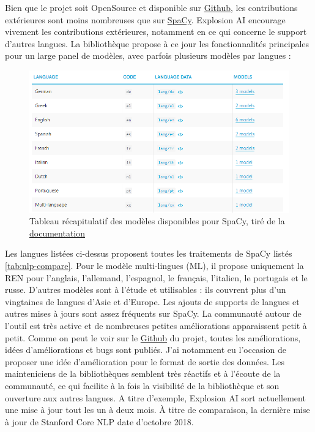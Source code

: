  Bien que le projet soit OpenSource et disponible sur \href{https://github.com/stanfordnlp/CoreNLP}{Github}, les contributions extérieures sont moins nombreuses que sur \href{https://github.com/explosion/spaCy}{SpaCy}. Explosion AI encourage vivement les contributions extérieures, notamment en ce qui concerne le support d'autres langues. La bibliothèque propose à ce jour les fonctionnalités principales pour un large panel de modèles, avec parfois plusieurs modèles par langues :
 \vspace{10pt}
\begin{figure}[H]
    \centering
    \includegraphics[scale=0.7]{images/spacy-lang.png}
    \caption{Tableau récapitulatif des modèles disponibles pour SpaCy, tiré de la \href{https://spacy.io/usage/models}{documentation}}
    \label{fig:spacy-lang}
\end{figure}
\vspace{10pt}

Les langues listées ci-dessus proposent toutes les traitements de SpaCy listés \autoref{tab:nlp-compare}. Pour le modèle multi-lingues (ML), il propose uniquement la REN pour l'anglais, l'allemand, l'espagnol, le français, l'italien, le portugais et le russe. D'autres modèles sont à l'étude et utilisables : ils couvrent plus d'un vingtaines de langues d'Asie et d'Europe. Les ajouts de supports de langues et autres mises à jours sont assez fréquents sur SpaCy. La communauté autour de l'outil est très active et de nombreuses petites améliorations apparaissent petit à petit. Comme on peut le voir sur le \href{https://github.com/explosion/spaCy}{Github} du projet, toutes les améliorations, idées d'améliorations et bugs sont publiés. J'ai notamment eu l'occasion de proposer une idée d'amélioration pour le format de sortie des données. Les mainteniciens de la bibliothèques semblent très réactifs et à l'écoute de la communauté, ce qui facilite à la fois la visibilité de la bibliothèque et son ouverture aux autres langues. A titre d'exemple, Explosion AI sort actuellement une mise à jour tout les un à deux mois. À titre de comparaison, la dernière mise à jour de Stanford Core NLP date d'octobre 2018.
\newline

